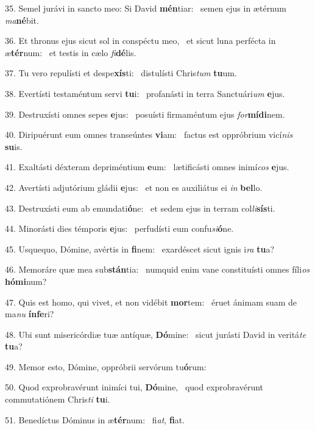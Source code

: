 35. Semel jurávi in sancto meo: Si David \textbf{mén}tiar: \ast\  semen ejus in ætérnum \textit{ma}\textbf{né}bit.\

36. Et thronus ejus sicut sol in conspéctu meo, \dag\  et sicut luna perfécta in æ\textbf{tér}num: \ast\  et testis in cælo \textit{fi}\textbf{dé}lis.\

37. Tu vero repulísti et despe\textbf{xís}ti: \ast\  distulísti Chris\textit{tum} \textbf{tu}um.\

38. Evertísti testaméntum servi \textbf{tu}i: \ast\  profanásti in terra Sanctuári\textit{um} \textbf{e}jus.\

39. Destruxísti omnes sepes \textbf{e}jus: \ast\  posuísti firmaméntum ejus \textit{for}\textbf{mí}\textbf{di}nem.\

40. Diripuérunt eum omnes transeúntes \textbf{vi}am: \ast\  factus est oppróbrium vicí\textit{nis} \textbf{su}is.\

41. Exaltásti déxteram depriméntium \textbf{e}um: \ast\  lætificásti omnes inimí\textit{cos} \textbf{e}jus.\

42. Avertísti adjutórium gládii \textbf{e}jus: \ast\  et non es auxiliátus ei \textit{in} \textbf{bel}lo.\

43. Destruxísti eum ab emundati\textbf{ó}ne: \ast\  et sedem ejus in terram col\textit{li}\textbf{sís}ti.\

44. Minorásti dies témporis \textbf{e}jus: \ast\  perfudísti eum confu\textit{si}\textbf{ó}ne.\

45. Usquequo, Dómine, avértis in \textbf{fi}nem: \ast\  exardéscet sicut ignis i\textit{ra} \textbf{tu}a?\

46. Memoráre quæ mea sub\textbf{stán}tia: \ast\  numquid enim vane constituísti omnes fíli\textit{os} \textbf{hó}\textbf{mi}num?\

47. Quis est homo, qui vivet, et non vidébit \textbf{mor}tem: \ast\  éruet ánimam suam de ma\textit{nu} \textbf{ín}\textbf{fe}ri?\

48. Ubi sunt misericórdiæ tuæ antíquæ, \textbf{Dó}mine: \ast\  sicut jurásti David in veritá\textit{te} \textbf{tu}a?\

49. Memor esto, Dómine, oppróbrii servórum tu\textbf{ó}rum: \ast\  \

50. Quod exprobravérunt inimíci tui, \textbf{Dó}mine, \ast\  quod exprobravérunt commutatiónem Chris\textit{ti} \textbf{tu}i.\

51. Benedíctus Dóminus in æ\textbf{tér}num: \ast\  fi\textit{at}, \textbf{fi}at.\

